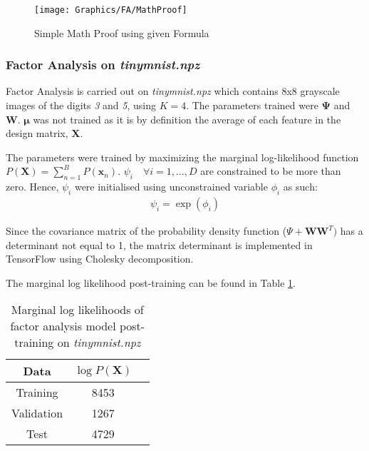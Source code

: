 \documentclass[a4paper,12pt]{article}
\newcommand{\x}{\mathbf{x}}
\newcommand{\X}{\mathbf{X}}
\begin{document}
\begin{figure}[!htb]
\centering
\texttt{[image: Graphics/FA/MathProof]}
\caption{Simple Math Proof using given Formula}
\label{fig:FA/MathProof}
\end{figure}



\clearpage
\subsubsection{Factor Analysis on \textit{tinymnist.npz}}
Factor Analysis is carried out on \textit{tinymnist.npz} which contains 8x8 grayscale images of the digits \textit{3} and \textit{5}, using $K=4$. The parameters trained were $\mathbf{\Psi}$ and $\mathbf{W}$. $\bm{\mu}$ was not trained as it is by definition the average of each feature in the design matrix, $\X$. 

The parameters were trained by maximizing the marginal log-likelihood function $P(\X) = \sum_{n=1}^B P(\x_n)$. $\psi_i \quad \forall i = 1, ..., D$ are constrained to be more than zero. Hence, $\psi_i$ were initialised using unconstrained variable $\phi_i$ as such:
\begin{align}
\psi_i = \exp(\phi_i)
\end{align}

Since the covariance matrix of the probability density function ($\Psi + \mathbf{WW}^T)$ has a determinant not equal to 1, the matrix determinant is implemented in TensorFlow using Cholesky decomposition. 

The marginal log likelihood post-training can be found in Table \ref{tab:FA/Q1_2_log_likelihood}.

\begin{table}[!htb]
\centering
\caption{Marginal log likelihoods of factor analysis model post-training on \textit{tinymnist.npz}}
\label{tab:FA/Q1_2_log_likelihood}
\begin{tabular}{|c|c|c|} \hline
Data & $\log P(\mathbf{X})$ \\ \hline
Training & 8453 \\
Validation & 1267 \\
Test & 4729 \\ \hline
\end{tabular}
\end{table}

\clearpage
\end{document}
